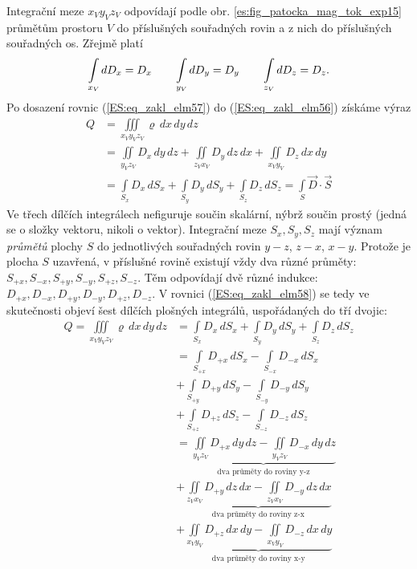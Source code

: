       Integrační meze \(x_Vy_Vz_V\) odpovídají podle obr. \ref{es:fig_patocka_mag_tok_exp15} 
      průmětům prostoru \(V\) do příslušných souřadných rovin a z nich do příslušných souřadných 
      os. Zřejmě platí
      \begin{equation}\label{ES:eq_zakl_elm57}
        \limitint_{\mathclap{x_V}}dD_x = D_x \qquad
        \limitint_{\mathclap{y_V}}dD_y = D_y \qquad
        \limitint_{\mathclap{z_V}}dD_z = D_z.
      \end{equation}
      Po dosazení rovnic (\ref{ES:eq_zakl_elm57}) do (\ref{ES:eq_zakl_elm56}) získáme výraz
      \begin{align}\label{ES:eq_zakl_elm58}
        Q &= \iiint\limits_{x_Vy_Vz_V}\varrho\,dx\,dy\,dz   \nonumber\\ 
          &= \iint\limits_{y_Vz_V}D_x\,dy\,dz + 
             \iint\limits_{z_Vx_V}D_y\,dz\,dx + 
             \iint\limits_{x_Vy_V}D_z\,dx\,dy               \nonumber\\ 
          &= \int\limits_{S_x}D_x\,dS_x + 
             \int\limits_{S_y}D_y\,dS_y + 
             \int\limits_{S_z}D_z\,dS_z =  \int\limits_{S}\vec{D}\cdot\vec{S}
      \end{align}
      Ve třech dílčích integrálech nefiguruje součin skalární, nýbrž součin prostý (jedná se o 
      složky vektoru, nikoli o vektor). Integrační meze \(S_x, S_y, S_z\) mají význam 
      \emph{průmětů} plochy \(S\) do jednotlivých souřadných rovin \(y-z\), \(z-x\), \(x-y\). 
      Protože je plocha \(S\) uzavřená, v příslušné rovině existují vždy dva různé průměty: 
      \(S_{+x}, S_{-x}, S_{+y}, S_{-y}, S_{+z}, S_{-z}\). Těm odpovídají dvě různé indukce: 
      \(D_{+x}, D_{-x}, D_{+y}, D_{-y}, D_{+z}, D_{-z}\). V rovnici (\ref{ES:eq_zakl_elm58}) se 
      tedy ve skutečnosti objeví šest dílčích plošných integrálů, uspořádaných do tří dvojic:
      \begin{align*}   %
        Q  = \iiint\limits_{x_Vy_Vz_V}\varrho\,dx\,dy\,dz   
          &= \int\limits_{S_x}D_x\,dS_x + 
             \int\limits_{S_y}D_y\,dS_y + 
             \int\limits_{S_z}D_z\,dS_z                                                \\
          &= \int\limits_{S_{+x}}D_{+x}\,dS_x - \int\limits_{S_{-x}}D_{-x}\,dS_x       \\
          &+ \int\limits_{S_{+y}}D_{+y}\,dS_y - \int\limits_{S_{-y}}D_{-y}\,dS_y       \\
          &+ \int\limits_{S_{+z}}D_{+z}\,dS_z - \int\limits_{S_{-z}}D_{-z}\,dS_z       \\
          &= \underbrace{\iint\limits_{y_Vz_V}D_{+x}\,dy\,dz 
           - \iint\limits_{y_Vz_V}D_{-x}\,dy\,dz}_{\text{dva průměty do roviny y-z}}   \\
          &+ \underbrace{\iint\limits_{z_Vx_V}D_{+y}\,dz\,dx 
           - \iint\limits_{z_Vx_V}D_{-y}\,dz\,dx}_{\text{dva průměty do roviny z-x}}   \\
          &+ \underbrace{\iint\limits_{x_Vy_V}D_{+z}\,dx\,dy 
           - \iint\limits_{x_Vy_V}D_{-z}\,dx\,dy}_{\text{dva průměty do roviny x-y}}
      \end{align*}
